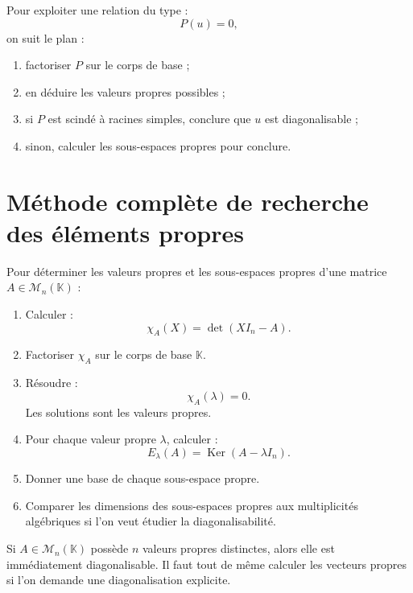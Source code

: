 \documentclass[11pt,a4paper]{article}
\newcommand{\K}{\mathbb K}
\newcommand{\M}{\mathcal M}
\newcommand{\Ker}{\operatorname{Ker}}
\begin{document}
\begin{methodbox}
Pour exploiter une relation du type :
\[
P(u)=0,
\]
on suit le plan :
\begin{enumerate}
    \item factoriser \(P\) sur le corps de base ;
    \item en déduire les valeurs propres possibles ;
    \item si \(P\) est scindé à racines simples, conclure que \(u\) est diagonalisable ;
    \item sinon, calculer les sous-espaces propres pour conclure.
\end{enumerate}
\end{methodbox}

\section{Méthode complète de recherche des éléments propres}

\begin{methodbox}
Pour déterminer les valeurs propres et les sous-espaces propres d'une matrice \(A\in\M_n(\K)\) :
\begin{enumerate}
    \item Calculer :
    \[
    \chi_A(X)=\det(XI_n-A).
    \]
    \item Factoriser \(\chi_A\) sur le corps de base \(\K\).
    \item Résoudre :
    \[
    \chi_A(\lambda)=0.
    \]
    Les solutions sont les valeurs propres.
    \item Pour chaque valeur propre \(\lambda\), calculer :
    \[
    E_\lambda(A)=\Ker(A-\lambda I_n).
    \]
    \item Donner une base de chaque sous-espace propre.
    \item Comparer les dimensions des sous-espaces propres aux multiplicités algébriques si l'on veut étudier la diagonalisabilité.
\end{enumerate}
\end{methodbox}

\begin{methodbox}
Si \(A\in\M_n(\K)\) possède \(n\) valeurs propres distinctes, alors elle est immédiatement diagonalisable.  
Il faut tout de même calculer les vecteurs propres si l'on demande une diagonalisation explicite.
\end{methodbox}
\end{document}
